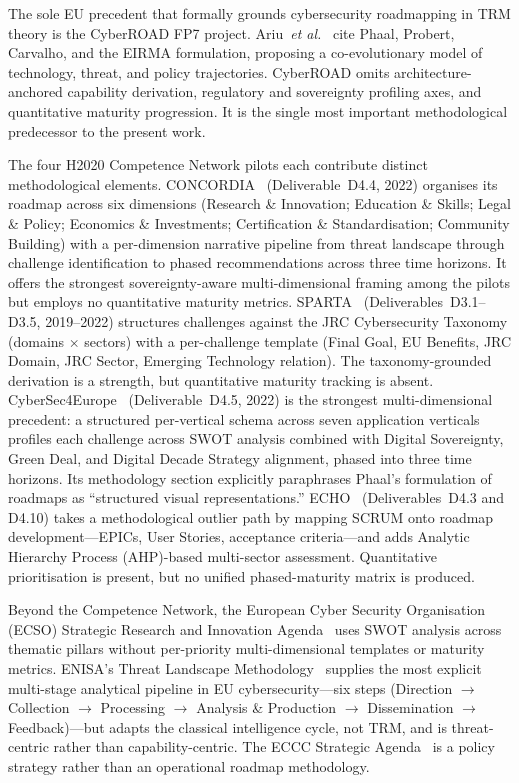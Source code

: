 The sole EU precedent that formally grounds cybersecurity roadmapping in
TRM theory is the CyberROAD FP7 project. Ariu~\textit{et al.}~\cite{ariu2016}
cite Phaal, Probert, Carvalho, and the EIRMA formulation, proposing a
co-evolutionary model of technology, threat, and policy trajectories.
CyberROAD omits architecture-anchored capability derivation,
regulatory and sovereignty profiling axes, and quantitative maturity
progression. It is the single most important methodological predecessor
to the present work.

The four H2020 Competence Network pilots each contribute distinct
methodological elements. CONCORDIA~\cite{concordia} (Deliverable~D4.4,
2022) organises its roadmap across six dimensions (Research \&
Innovation; Education \& Skills; Legal \& Policy; Economics \&
Investments; Certification \& Standardisation; Community Building) with
a per-dimension narrative pipeline from threat landscape through
challenge identification to phased recommendations across three time
horizons. It offers the strongest sovereignty-aware multi-dimensional
framing among the pilots but employs no quantitative maturity metrics.
SPARTA~\cite{sparta_d34} (Deliverables~D3.1--D3.5, 2019--2022) structures
challenges against the JRC Cybersecurity Taxonomy (domains $\times$
sectors) with a per-challenge template (Final Goal, EU Benefits, JRC
Domain, JRC Sector, Emerging Technology relation). The taxonomy-grounded
derivation is a strength, but quantitative maturity tracking is absent.
CyberSec4Europe~\cite{cybersec4europe_d45} (Deliverable~D4.5, 2022) is
the strongest multi-dimensional precedent: a structured per-vertical
schema across seven application verticals profiles each challenge across
SWOT analysis combined with Digital Sovereignty, Green Deal, and Digital
Decade Strategy alignment, phased into three time horizons. Its
methodology section explicitly paraphrases Phaal's formulation of
roadmaps as ``structured visual representations.''
ECHO~\cite{echo_d43} (Deliverables~D4.3 and D4.10) takes a
methodological outlier path by mapping SCRUM onto roadmap
development---EPICs, User Stories, acceptance criteria---and adds
Analytic Hierarchy Process (AHP)-based multi-sector assessment.
Quantitative prioritisation is present, but no unified phased-maturity
matrix is produced.

Beyond the Competence Network, the European Cyber Security Organisation
(ECSO) Strategic Research and Innovation Agenda~\cite{ecso_sria} uses
SWOT analysis across thematic pillars without per-priority
multi-dimensional templates or maturity metrics. ENISA's Threat
Landscape Methodology~\cite{enisa_ctl} supplies the most explicit
multi-stage analytical pipeline in EU cybersecurity---six steps
(Direction $\rightarrow$ Collection $\rightarrow$ Processing
$\rightarrow$ Analysis \& Production $\rightarrow$ Dissemination
$\rightarrow$ Feedback)---but adapts the classical intelligence cycle,
not TRM, and is threat-centric rather than capability-centric. The ECCC
Strategic Agenda~\cite{eccc} is a policy strategy rather than an
operational roadmap methodology.

